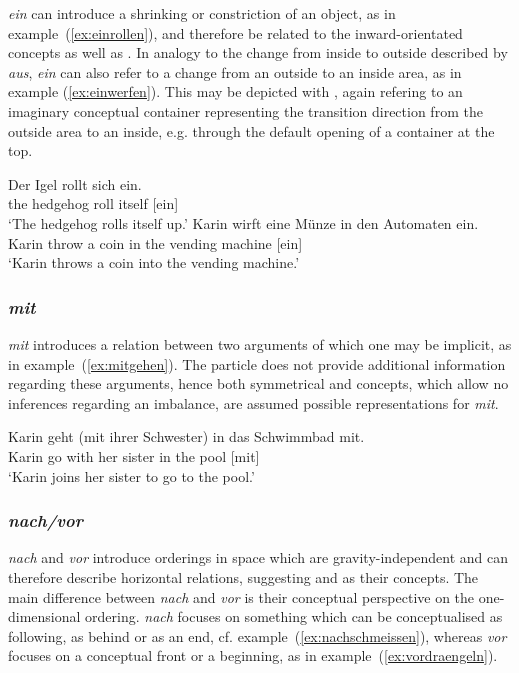 \documentclass[output=paper]{langsci/langscibook}
\begin{document}
\textit{ein} can introduce a shrinking or constriction of an object,
as in example~(\ref{ex:einrollen}), and therefore be related to the
inward-orientated concepts  as well as
. In analogy to the change from inside to outside
described by \textit{aus}, \textit{ein} can also refer to a change
from an outside to an inside area, as in example
(\ref{ex:einwerfen}). This may be depicted with ,
again refering to an imaginary conceptual container representing the
transition direction from the outside area to an inside, e.g.  through
the default opening of a container at the top.

\ea\label{ex:einrollen}
\gll Der Igel rollt sich ein.\\
the hedgehog roll itself [ein]\\
\glt `The hedgehog rolls itself up.'
\ex \label{ex:einwerfen}
\gll Karin wirft eine Münze in den Automaten ein.\\
Karin throw a coin in the {vending machine} [ein]\\
\glt `Karin throws a coin into the vending machine.'
\z


\subsubsection{\textit{mit}}

\textit{mit} introduces a relation between two arguments of which one
may be implicit, as in example~(\ref{ex:mitgehen}). The particle does
not provide additional information regarding these arguments, hence
both symmetrical  and  concepts,
which allow no inferences regarding an imbalance, are assumed possible
representations for \textit{mit}.

\ea\label{ex:mitgehen}
\gll Karin geht (mit ihrer Schwester) in das Schwimmbad mit.\\
Karin go with her sister in the pool [mit]\\
\glt `Karin joins her sister to go to the pool.'
\z


\subsubsection{\textit{nach/vor}}

\textit{nach} and \textit{vor} introduce orderings in space which are
gravity-independent and can therefore describe horizontal relations,
suggesting  and  as their
concepts. The main difference between \textit{nach} and \textit{vor}
is their conceptual perspective on the one-dimensional
ordering. \textit{nach} focuses on something which can be
conceptualised as following, as behind or as an end, cf.
example~(\ref{ex:nachschmeissen}), whereas \textit{vor} focuses on a
conceptual front or a beginning, as in
example~(\ref{ex:vordraengeln}).
\end{document}
